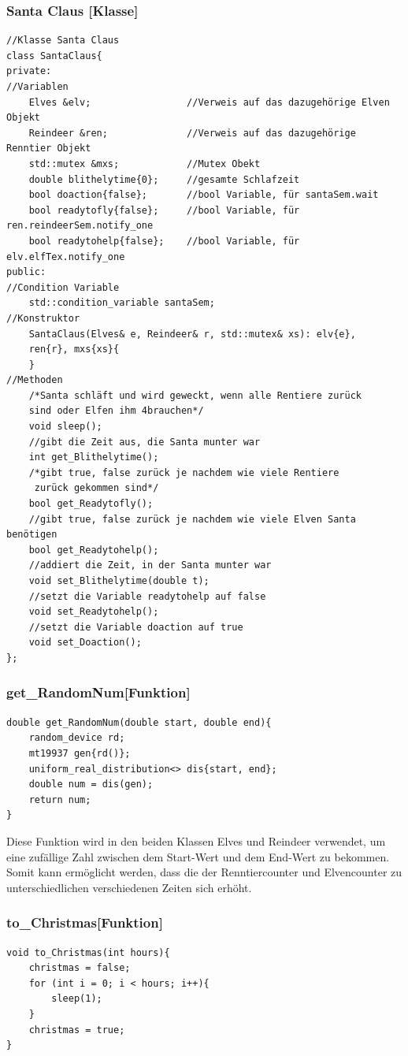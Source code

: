\documentclass[a4paper,12pt]{article}
\begin{document}
\newpage
\subsubsection{Santa Claus [Klasse]}
\begin{verbatim}
//Klasse Santa Claus
class SantaClaus{
private:
//Variablen
    Elves &elv;                 //Verweis auf das dazugehörige Elven Objekt
    Reindeer &ren;              //Verweis auf das dazugehörige Renntier Objekt
    std::mutex &mxs;            //Mutex Obekt
    double blithelytime{0};     //gesamte Schlafzeit
    bool doaction{false};       //bool Variable, für santaSem.wait
    bool readytofly{false};     //bool Variable, für ren.reindeerSem.notify_one       
    bool readytohelp{false};    //bool Variable, für elv.elfTex.notify_one
public:
//Condition Variable
    std::condition_variable santaSem;
//Konstruktor
    SantaClaus(Elves& e, Reindeer& r, std::mutex& xs): elv{e},
    ren{r}, mxs{xs}{
    }
//Methoden
    /*Santa schläft und wird geweckt, wenn alle Rentiere zurück 
    sind oder Elfen ihm 4brauchen*/
    void sleep();      
    //gibt die Zeit aus, die Santa munter war         
    int get_Blithelytime(); 
    /*gibt true, false zurück je nachdem wie viele Rentiere
     zurück gekommen sind*/
    bool get_Readytofly(); 
    //gibt true, false zurück je nachdem wie viele Elven Santa benötigen
    bool get_Readytohelp();
    //addiert die Zeit, in der Santa munter war
    void set_Blithelytime(double t);
    //setzt die Variable readytohelp auf false
    void set_Readytohelp();
    //setzt die Variable doaction auf true
    void set_Doaction();
};
\end{verbatim}
\subsubsection{get\_RandomNum[Funktion]}
\begin{verbatim}
double get_RandomNum(double start, double end){
    random_device rd;
    mt19937 gen{rd()};
    uniform_real_distribution<> dis{start, end};
    double num = dis(gen);
    return num;
}
\end{verbatim}
Diese Funktion wird in den beiden Klassen Elves und Reindeer verwendet, um eine zufällige Zahl zwischen dem
Start-Wert und dem End-Wert zu bekommen. Somit kann ermöglicht werden, dass die der Renntiercounter und Elvencounter zu unterschiedlichen
verschiedenen Zeiten sich erhöht. 
\\
\subsubsection{to\_Christmas[Funktion]}
\begin{verbatim}
void to_Christmas(int hours){
    christmas = false;
    for (int i = 0; i < hours; i++){
        sleep(1);
    }
    christmas = true;
}
\end{verbatim}
\end{document}
